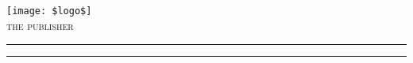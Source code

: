 \texttt{[image: \$logo\$]}\\[1cm] 

{\large\textsc{the publisher}} %

\vspace{0.1\textheight} %


\rule{\textwidth}{0.4pt} %

\vspace{2pt}\vspace{-\baselineskip} %

\rule{\textwidth}{1pt} %


